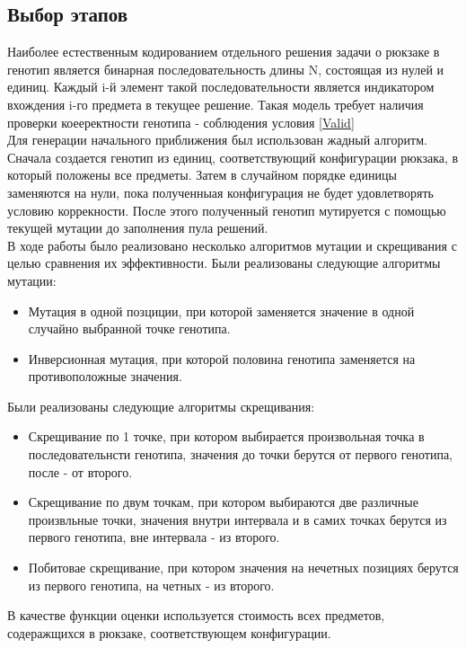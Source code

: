 \subsection{Выбор этапов}%
Наиболее естественным кодированием отдельного решения задачи о рюкзаке в генотип является бинарная последовательность длины N, состоящая из нулей и единиц.
Каждый i-й элемент такой последовательности является индикатором вхождения i-го предмета в текущее решение. Такая модель требует наличия проверки коееректности генотипа - соблюдения условия \ref{Valid} 
\\ Для генерации начального приближения был использован жадный алгоритм. Сначала создается генотип из единиц, соответствующий конфигурации рюкзака, в который положены все предметы. Затем в случайном порядке единицы заменяются на нули, пока полученныая конфигурация не будет удовлетворять условию коррекности. После этого полученный генотип мутируется с помощью текущей мутации до заполнения пула решений.
\\ В ходе работы было реализовано несколько алгоритмов мутации и скрещивания с целью сравнения их эффективности. Были реализованы следующие алгоритмы мутации:
\begin{itemize}
	\item Мутация в одной позциции, при которой заменяется значение в одной случайно выбранной точке генотипа.
	\item Инверсионная мутация, при которой половина генотипа заменяется на противоположные значения.
\end{itemize}
 Были реализованы следующие алгоритмы скрещивания:
 \begin{itemize}
	\item Скрещивание по 1 точке, при котором выбирается произвольная точка в последовательнсти генотипа, значения до точки берутся от первого генотипа, после - от второго. 
	\item Скрещивание по двум точкам, при котором выбираются две различные произвльные точки, значения внутри интервала и в самих точках берутся из первого генотипа, вне интервала - из второго. 
	\item Побитовае скрещивание, при котором значения на нечетных позициях берутся из первого генотипа, на четных - из второго.  
 \end{itemize}
 В качестве функции оценки используется стоимость всех предметов, содеражщихся в рюкзаке, соответствующем конфигурации.
 
